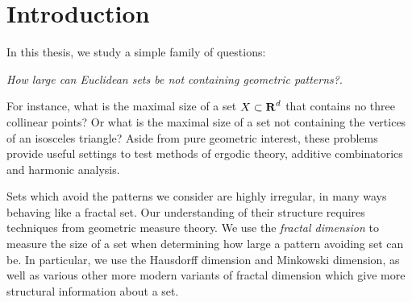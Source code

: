 
\chapter{Introduction}
\label{ch:Introduction}

In this thesis, we study a simple family of questions:
%
\begin{center}
	{\it How large can Euclidean sets be not containing geometric patterns?}.
\end{center}
%
For instance, what is the maximal size of a set $X \subset \operatorname{\mathbf{R}}^d$ that contains no three collinear points? Or what is the maximal size of a set not containing the vertices of an isosceles triangle? Aside from pure geometric interest, these problems provide useful settings to test methods of ergodic theory, additive combinatorics and harmonic analysis.

Sets which avoid the patterns we consider are highly irregular, in many ways behaving like a fractal set. Our understanding of their structure requires techniques from geometric measure theory. We use the \emph{fractal dimension} to measure the size of a set when determining how large a pattern avoiding set can be. In particular, we use the Hausdorff dimension and Minkowski dimension, as well as various other more modern variants of fractal dimension which give more structural information about a set.




